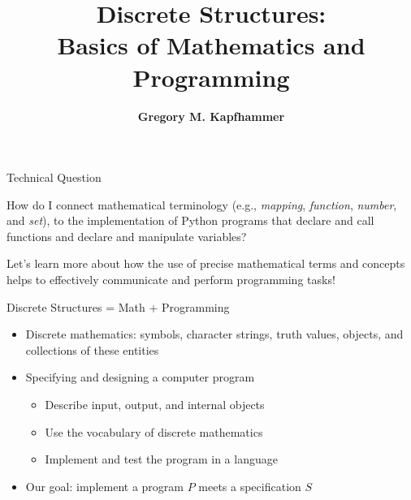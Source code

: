 \documentclass[14pt,aspectratio=169]{beamer}
\title{Discrete Structures: \\ Basics of Mathematics and Programming}
\author{{\bf Gregory M. Kapfhammer}}
\institute[shortinst]{{\bf Department of Computer Science, Allegheny College}}
\begin{document}
{
  \begin{frame}
    \titlepage
  \end{frame}
}

%
\begin{frame}{Technical Question}
  \begin{center}
    {\large How do I connect mathematical terminology (e.g., {\em mapping},
      {\em function}, {\em number}, and {\em set}), to the implementation of
      Python programs that declare and call functions and declare and manipulate
    variables?}
  \end{center}
  \vspace{2ex}
  \begin{center}
    \small Let's learn more about how the use of precise mathematical terms and
    concepts helps to effectively communicate and perform programming tasks!
  \end{center}
\end{frame}

%
\begin{frame}{Discrete Structures = Math + Programming}
%
  \begin{itemize}
    \item Discrete mathematics: symbols, character strings, truth values,
      objects, and collections of these entities
    \item Specifying and designing a computer program
      \begin{itemize}
        \item Describe input, output, and internal objects
        \item Use the vocabulary of discrete mathematics
        \item Implement and test the program in a language
      \end{itemize}
    \item Our goal: implement a program $P$ meets a specification $S$
  \end{itemize}
%
\end{frame}
\end{document}
